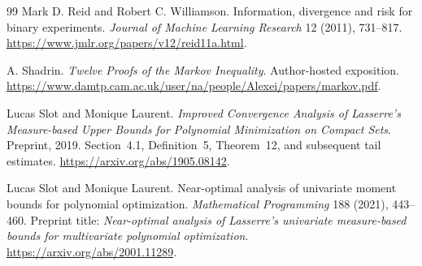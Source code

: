 \begin{thebibliography}{99}
Mark D. Reid and Robert C. Williamson.
Information, divergence and risk for binary experiments.
\emph{Journal of Machine Learning Research} 12 (2011), 731--817.
\url{https://www.jmlr.org/papers/v12/reid11a.html}.

A. Shadrin.
\emph{Twelve Proofs of the Markov Inequality}. Author-hosted exposition.
\url{https://www.damtp.cam.ac.uk/user/na/people/Alexei/papers/markov.pdf}.

Lucas Slot and Monique Laurent.
\emph{Improved Convergence Analysis of Lasserre's Measure-based Upper Bounds
for Polynomial Minimization on Compact Sets}. Preprint, 2019.
Section~4.1, Definition~5, Theorem~12, and subsequent tail estimates.
\url{https://arxiv.org/abs/1905.08142}.

Lucas Slot and Monique Laurent.
Near-optimal analysis of univariate moment bounds for polynomial optimization.
\emph{Mathematical Programming} 188 (2021), 443--460.
Preprint title: \emph{Near-optimal analysis of Lasserre's univariate
measure-based bounds for multivariate polynomial optimization}.
\url{https://arxiv.org/abs/2001.11289}.
\end{thebibliography}
